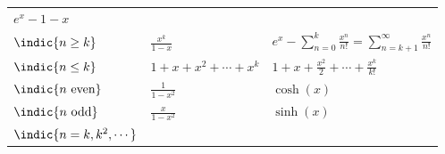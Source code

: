 \begin{longtable}[]{@{}lll@{}}
\begin{minipage}[t]{0.30\columnwidth}
\(e^x - 1 - x\)\strut
\end{minipage}\tabularnewline
\begin{minipage}[t]{0.30\columnwidth}\raggedright
\(\indic{n \geq k}\)\strut
\end{minipage} & \begin{minipage}[t]{0.30\columnwidth}\raggedright
\(\frac {x^k} {1-x}\)\strut
\end{minipage} & \begin{minipage}[t]{0.30\columnwidth}\raggedright
\(e^x - \displaystyle\sum_{n=0}^k \frac{x^n}{n!} =\displaystyle\sum_{n=k+1}^\infty \frac{x^n}{n!}\)\strut
\end{minipage}\tabularnewline
\begin{minipage}[t]{0.30\columnwidth}\raggedright
\(\indic{n \leq k}\)\strut
\end{minipage} & \begin{minipage}[t]{0.30\columnwidth}\raggedright
\(1+x+x^2+\cdots +x^k\)\strut
\end{minipage} & \begin{minipage}[t]{0.30\columnwidth}\raggedright
\(1 + x + \frac{x^2}{2} + \cdots +\frac{x^k}{k!}\)\strut
\end{minipage}\tabularnewline
\begin{minipage}[t]{0.30\columnwidth}\raggedright
\(\indic{n\text{ even}}\)\strut
\end{minipage} & \begin{minipage}[t]{0.30\columnwidth}\raggedright
\(\frac{1}{1-x^2}\)\strut
\end{minipage} & \begin{minipage}[t]{0.30\columnwidth}\raggedright
\(\cosh(x)\)\strut
\end{minipage}\tabularnewline
\begin{minipage}[t]{0.30\columnwidth}\raggedright
\(\indic{n\text{ odd}}\)\strut
\end{minipage} & \begin{minipage}[t]{0.30\columnwidth}\raggedright
\(\frac{x}{1-x^2}\)\strut
\end{minipage} & \begin{minipage}[t]{0.30\columnwidth}\raggedright
\(\sinh(x)\)\strut
\end{minipage}\tabularnewline
\begin{minipage}[t]{0.30\columnwidth}\raggedright
\(\indic{n = k, k^2, \cdots}\)\strut
\end{minipage} & \begin{minipage}[t]{0.30\columnwidth}\raggedright

\end{minipage}
\end{longtable}

